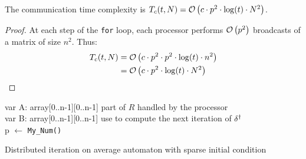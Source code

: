 \begin{prop}
 The communication time complexity is $T_c(t,N) = \mathcal O \left( c \cdot p^2 \cdot \log(t) \cdot N^2 \right)$.
\end{prop}

\begin{proof}
 At each step of the \texttt{for} loop, each processor performs $\mathcal O \left( p^2 \right)$ broadcasts of a matrix of size $n^2$. Thus:
  \[
    \begin{split}
        T_c(t,N) & = \mathcal O \left( c \cdot p^2 \cdot p^2 \cdot \log(t) \cdot n^2 \right) \\
                 & = \mathcal O \left( c \cdot p^2 \cdot \log(t) \cdot N^2 \right)
    \end{split}
 \] 
\end{proof}

\iffalse
\begin{algorithm}[H]
    \DontPrintSemicolon
    \LinesNotNumbered
    var A: array[0..n-1][0..n-1] part of $R$ handled by the processor \\
    var B: array[0..n-1][0..n-1] use to compute the next iteration of $\delta^{\dag}$ \\ 
    p $\leftarrow$ \texttt{My\_Num()} \\
\caption{Distributed iteration on average automaton with sparse initial condition\label{algoq6}}
\end{algorithm}

